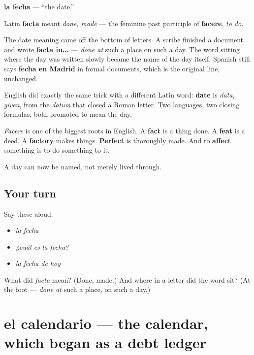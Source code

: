 \begin{cousinweb}
\textbf{la fecha} — \textquotedblleft{}the date.\textquotedblright{}

Latin \textbf{facta} meant \emph{done, made} — the feminine past participle of \textbf{facere}, \emph{to do}.

The date meaning came off the bottom of letters. A scribe finished a document and wrote \textbf{facta in...} — \emph{done at} such a place on such a day. The word sitting where the day was written slowly became the name of the day itself. Spanish still says \textbf{fecha en Madrid} in formal documents, which is the original line, unchanged.

English did exactly the same trick with a different Latin word: \textbf{date} is \emph{data}, \emph{given}, from the \emph{datum} that closed a Roman letter. Two languages, two closing formulas, both promoted to mean the day.

\emph{Facere} is one of the biggest roots in English. A \textbf{fact} is a thing done. A \textbf{feat} is a deed. A \textbf{factory} makes things. \textbf{Perfect} is thoroughly made. And to \textbf{affect} something is to do something to it.
\end{cousinweb}

\begin{grammarlens}[title={What you've built}]
A day can now be named, not merely lived through.
\end{grammarlens}

\subsection*{Your turn}
Say these aloud:

\begin{itemize}
\raggedright
  \item \emph{la fecha}
  \item \emph{¿cuál es la fecha?}
  \item \emph{la fecha de hoy}
\end{itemize}

\begin{tcolorbox}[breakable,colback=teal!4,colframe=teal!35!black,title={Before you move on}]
What did \emph{facta} mean? (Done, made.) And where in a letter did the word sit? (At the foot — \emph{done at} such a place, on such a day.)
\end{tcolorbox}
\section[el calendario]{el calendario — the calendar, which began as a debt ledger}

